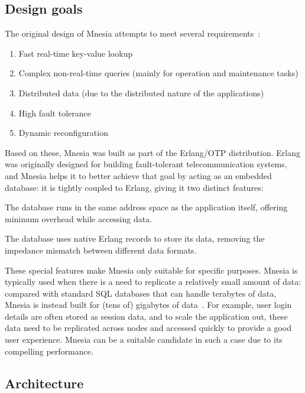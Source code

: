 \subsection{Design goals} \label{subsec:bg mnesia design goal}

The original design of Mnesia attempts to meet several requirements~\cite{ericssonab2023mnesiaguide}:

\begin{enumerate}
  \item Fast real-time key-value lookup
  \item Complex non-real-time queries (mainly for operation and maintenance tasks)
  \item Distributed data (due to the distributed nature of the applications)
  \item High fault tolerance
  \item Dynamic reconfiguration
\end{enumerate}

Based on these, Mnesia was built as part of the Erlang/OTP distribution.
Erlang was originally designed for building fault-tolerant telecommunication systems,
and Mnesia helps it to better achieve that goal by acting as an embedded database: 
it is tightly coupled to Erlang, giving it two distinct features:
\begin{enumerate*}[(a)]
  \item The database runs in the same address space as the application itself,
  offering minimum overhead while accessing data.
  \item The database uses native Erlang records to store its data,
  removing the impedance mismatch between different data formats.
\end{enumerate*}

These special features make Mnesia only suitable for specific purposes.
Mnesia is typically used when there is a need to replicate a 
relatively small amount of data: compared with standard SQL databases that can
handle terabytes of data, Mnesia is instead built for (tens of) gigabytes of 
data~\cite{hebert2013LYSE}.
For example, user login details are often stored as session data, and to 
scale the application out, these data need to be replicated across
nodes and accessed quickly to provide a good user experience. 
Mnesia can be a suitable candidate in such a case due to its compelling performance.

\subsection{Architecture} \label{subsec:bg mnesia arch}

